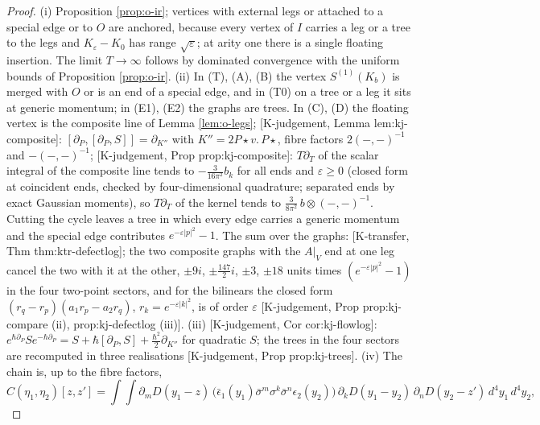 \begin{proof}
(i) Proposition \ref{prop:o-ir}; vertices with external legs or attached to a special edge or to $O$ are anchored, because every vertex of $I$ carries a leg or a tree to the legs and $K_\varepsilon-K_0$ has range $\sqrt\varepsilon$; at arity one there is a single floating insertion. The limit $T\to\infty$ follows by dominated convergence with the uniform bounds of Proposition \ref{prop:o-ir}. (ii) In (T), (A), (B) the vertex $S^{(1)}(K_b)$ is merged with $O$ or is an end of a special edge, and in (T0) on a tree or a leg it sits at generic momentum; in (E1), (E2) the graphs are trees. In (C), (D) the floating vertex is the composite line of Lemma \ref{lem:o-legs}; [K-judgement, Lemma lem:kj-composite]: $[\partial_P,[\partial_P,S]]=\partial_{K''}$ with $K''=2P\star v.\,P\star$, fibre factors $2(-,-)^{-1}$ and $-(-,-)^{-1}$; [K-judgement, Prop prop:kj-composite]: $T\partial_T$ of the scalar integral of the composite line tends to $-\tfrac{3}{16\pi^2}b_k$ for all ends and $\varepsilon\ge0$ (closed form at coincident ends, checked by four-dimensional quadrature; separated ends by exact Gaussian moments), so $T\partial_T$ of the kernel tends to $\tfrac{3}{8\pi^2}\,b\otimes(-,-)^{-1}$. Cutting the cycle leaves a tree in which every edge carries a generic momentum and the special edge contributes $e^{-\varepsilon|p|^2}-1$. The sum over the graphs: [K-transfer, Thm thm:ktr-defectlog]; the two composite graphs with the $A|_V$ end at one leg cancel the two with it at the other, $\pm9i$, $\pm\tfrac{147}2i$, $\pm3$, $\pm18$ units times $(e^{-\varepsilon|p|^2}-1)$ in the four two-point sectors, and for the bilinears the closed form $(r_q-r_p)(a_1r_p-a_2r_q)$, $r_k=e^{-\varepsilon|k|^2}$, is of order $\varepsilon$ [K-judgement, Prop prop:kj-compare (ii), prop:kj-defectlog (iii)]. (iii) [K-judgement, Cor cor:kj-flowlog]: $e^{\hbar\partial_P}Se^{-\hbar\partial_P}=S+\hbar[\partial_P,S]+\tfrac{\hbar^2}2\partial_{K''}$ for quadratic $S$; the trees in the four sectors are recomputed in three realisations [K-judgement, Prop prop:kj-trees]. (iv) The chain is, up to the fibre factors,
\begin{equation}
C(\eta_1,\eta_2)[z,z']=\int\!\!\int\partial_mD(y_1-z)\,\big(\bar\epsilon_1(y_1)\bar\sigma^m\sigma^k\bar\sigma^n\epsilon_2(y_2)\big)\,\partial_kD(y_1-y_2)\,\partial_nD(y_2-z')\,d^4y_1\,d^4y_2 ,
\label{eq:o-pair}
\end{equation}

\end{proof}
